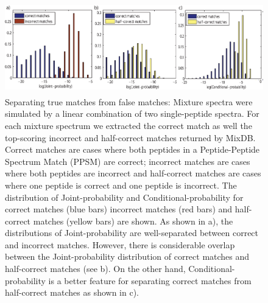 \documentclass[runningheads,a4paper]{llncs}
\begin{document}
\begin{figure}
	\centering
	 \includegraphics[height=40mm, width=120mm]{figures/MixGF_separation_true_false_matches.eps}
		\caption{Separating true matches from false matches:
		Mixture spectra were simulated by a linear combination of two single-peptide spectra. For each mixture spectrum we extracted the correct match as well the top-scoring incorrect and half-correct matches returned by MixDB.  Correct matches are cases where both peptides in a Peptide-Peptide Spectrum Match (PPSM) are correct; incorrect matches are cases where both peptides are incorrect and half-correct matches are cases where one peptide is correct and one peptide is incorrect. The distribution of Joint-probability and Conditional-probability for correct matches (blue bars) incorrect matches (red bars) and half-correct matches (yellow bars) are shown.  As shown in a), the distributions of Joint-probability are well-separated between correct and incorrect matches. However, there is considerable overlap between the Joint-probability distribution of correct matches and half-correct matches (see b).  On the other hand, Conditional-probability is a better feature for separating correct matches from half-correct matches as shown in c).}
\label{separate}
\end{figure}
\end{document}
